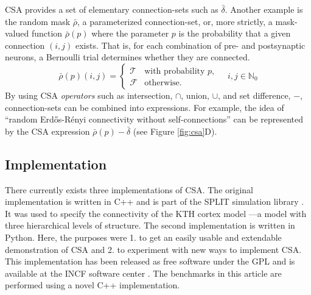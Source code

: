 \documentclass{frontiersSCNS} %
\begin{document}
CSA provides a set of elementary connection-sets such as
$\bar{\delta}$. Another example is the random mask $\bar{\rho}$, a
parameterized connection-set, or, more strictly, a mask-valued
function $\bar{\rho}(p)$ where the parameter $p$ is the probability
that a given connection $(i, j)$ exists.  That is, for each
combination of pre- and postsynaptic neurons, a Bernoulli trial
determines whether they are connected.
\begin{equation}
  \bar{\rho} (p) (i, j) =
  \begin{cases}
    \mathcal{T}& \text{with probability $p$},\\
    \mathcal{F}& \text{otherwise}.
  \end{cases}
  \quad i, j \in \mathbb{N}_0
\end{equation}
By using CSA \emph{operators} such as intersection, $\cap$, union,
$\cup$, and set difference, $-$, connection-sets can be combined into
expressions. For example, the idea of ``random Erd\H{o}s-R\'enyi
connectivity without self-connections'' can be represented by the CSA
expression $\bar{\rho}(p) - \bar{\delta}$ (see Figure
\ref{fig:csa}D).


\subsection{Implementation}\label{sec:impl}

There currently exists three implementations of CSA.  The original
implementation is written in C++ and is part of the SPLIT simulation
library \citep{djurfeldt05}.  It was used to specify the connectivity
of the KTH cortex model \citep{djurfeldt08}---a model with three
hierarchical levels of structure.  The second implementation is
written in Python.  Here, the purposes were 1. to get an easily usable
and extendable demonstration of CSA and 2. to experiment with new ways
to implement CSA. This implementation has been released as free
software under the GPL and is available at the INCF software center
\citep{djurfeldt10}.  The benchmarks in this article are performed
using a novel C++ implementation.
\end{document}
